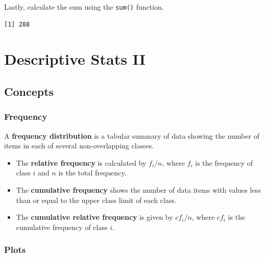 \documentclass[
  letterpaper,
  DIV=11,
  numbers=noendperiod]{scrreprt}
\newenvironment{Shaded}{\begin{snugshade}}{\end{snugshade}}
\newcommand{\FunctionTok}[1]{\textcolor[rgb]{0.28,0.35,0.67}{#1}}
\newcommand{\NormalTok}[1]{\textcolor[rgb]{0.00,0.23,0.31}{#1}}
\newcommand{\SpecialCharTok}[1]{\textcolor[rgb]{0.37,0.37,0.37}{#1}}
\providecommand{\tightlist}{%
  \setlength{\itemsep}{0pt}\setlength{\parskip}{0pt}}\usepackage{longtable,booktabs,array}
\begin{document}
Lastly, calculate the sum using the \texttt{sum()} function.

\begin{Shaded}
\end{Shaded}

\begin{verbatim}
[1] 288
\end{verbatim}

\hypertarget{descriptive-stats-ii}{%
\chapter{Descriptive Stats II}\label{descriptive-stats-ii}}

\hypertarget{concepts-1}{%
\section{Concepts}\label{concepts-1}}

\hypertarget{frequency}{%
\subsection*{Frequency}\label{frequency}}

A \textbf{frequency distribution} is a tabular summary of data showing
the number of items in each of several non-overlapping classes.

\begin{itemize}
\tightlist
\item
  The \textbf{relative frequency} is calculated by \(f_{i}/n\), where
  \(f_{i}\) is the frequency of class \(i\) and \(n\) is the total
  frequency.
\item
  The \textbf{cumulative frequency} shows the number of data items with
  values less than or equal to the upper class limit of each class.
\item
  The \textbf{cumulative relative frequency} is given by \(cf_{i}/n\),
  where \(cf_{i}\) is the cumulative frequency of class \(i\).
\end{itemize}

\hypertarget{plots}{%
\subsection*{Plots}\label{plots}}
\end{document}
